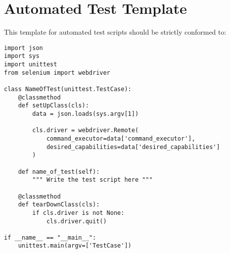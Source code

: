 \section{Automated Test Template}
\thispagestyle{plain}

This template for automated test scripts should be strictly conformed to:
    
\begin{lstlisting}[caption=Template for Automated Test Scripts, label={listing.test_template}]
import json
import sys
import unittest
from selenium import webdriver

class NameOfTest(unittest.TestCase):
    @classmethod
    def setUpClass(cls):
        data = json.loads(sys.argv[1])

        cls.driver = webdriver.Remote(
            command_executor=data['command_executor'],
            desired_capabilities=data['desired_capabilities']
        )

    def name_of_test(self):
        """ Write the test script here """

    @classmethod
    def tearDownClass(cls):
        if cls.driver is not None:
            cls.driver.quit()

if __name__ == "__main__":
    unittest.main(argv=['TestCase'])
\end{lstlisting}